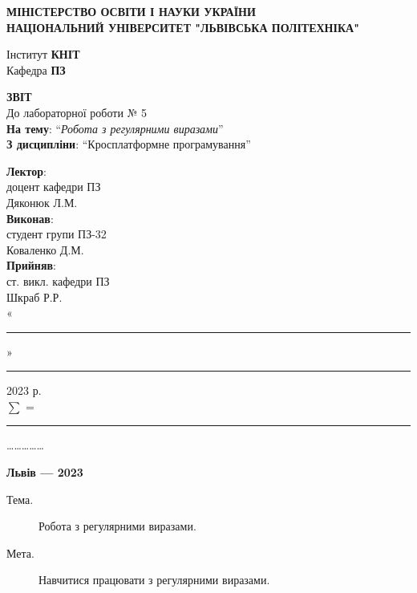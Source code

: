 \documentclass[14pt]{extreport}
\newcommand\subject{Кросплатформне програмування}
\newcommand\lecturer{доцент кафедри ПЗ\\Дяконюк Л.М.}
\newcommand\teacher{ст. викл. кафедри ПЗ\\Шкраб Р.Р.}
\newcommand\mygroup{ПЗ-32}
\newcommand\lab{5}
\newcommand\theme{Робота з регулярними виразами}
\newcommand\purpose{Навчитися працювати з регулярними виразами}
\begin{document}
\begin{normalsize}
	\begin{titlepage}
		\thispagestyle{empty}
		\begin{center}
			\textbf{МІНІСТЕРСТВО ОСВІТИ І НАУКИ УКРАЇНИ\\
				НАЦІОНАЛЬНИЙ УНІВЕРСИТЕТ "ЛЬВІВСЬКА ПОЛІТЕХНІКА"}
		\end{center}
		\begin{flushright}
			Інститут \textbf{КНІТ}\\
			Кафедра \textbf{ПЗ}
		\end{flushright}
		\vspace{160pt}
		\begin{center}
			\textbf{ЗВІТ}\\
			\vspace{10pt}
			До лабораторної роботи № \lab\\
			\textbf{На тему}: “\textit{\theme}”\\
			\textbf{З дисципліни}: “\subject”
		\end{center}
		\vspace{40pt}
		\begin{flushright}
			
			\textbf{Лектор}:\\
			\lecturer\\
			\vspace{10pt}
			\textbf{Виконав}:\\
			
			студент групи \mygroup\\
			Коваленко Д.М.\\
			\vspace{10pt}
			\textbf{Прийняв}:\\
			
			\teacher\\
			
			\vspace{28pt}
			«\rule{1cm}{0.15mm}» \rule{1.5cm}{0.15mm} 2023 р.\\
			$\sum$ = \rule{1cm}{0.15mm}……………\\
			
		\end{flushright}
		\vspace{\fill}
		\begin{center}
			\textbf{Львів — 2023}
		\end{center}
	\end{titlepage}
		
	\begin{description}
		\item[Тема.] \theme.
		\item[Мета.] \purpose.
	\end{description}
	


\end{normalsize}
\end{document}
